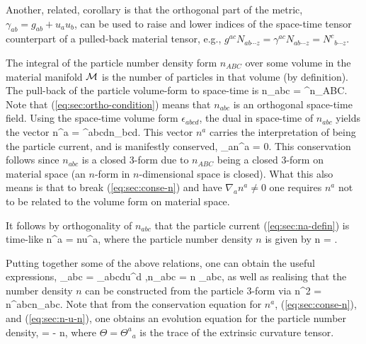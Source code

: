 Another, related, corollary is that the orthogonal part of the metric, $\gamma_{ab} = g_{ab} + u_au_b$, can be used to raise and lower indices of the space-time tensor counterpart of a pulled-back material tensor, e.g., $g^{ac}N_{ab\cdots z} = \gamma^{ac}N_{ab\cdots z} = {N^c}_{b\cdots z}$.

The integral of the particle number density form $n_{ABC}$ over some volume in the material manifold $\mathcal{M}$ is the number of particles in that volume (by definition). The pull-back of the particle volume-form to   space-time   is
\bea
n_{abc} = \psi^\star n_{ABC}.
\eea
Note that (\ref{eq:sec:ortho-condition}) means that $n_{abc}$ is an orthogonal space-time field.
Using   the space-time volume form $\epsilon_{abcd}$, the dual in space-time of $n_{abc}$ yields the vector
\bea
\label{eq:sec:na-defin}
n^a = \epsilon^{abcd}n_{bcd}.
\eea
This vector $n^a$ carries the interpretation of being the particle current, and is manifestly conserved,
\bea
\label{eq:sec:conse-n}
\nabla_an^a = 0.
\eea
This conservation follows since $n_{abc}$ is a closed 3-form due to $n_{ABC}$ being a closed 3-form on material space (an $n$-form in $n$-dimensional space is closed). What this also means is that to break (\ref{eq:sec:conse-n}) and have $\nabla_an^a\neq 0$ one requires $n^a$ not to be related to the volume form on material space.  

It follows by orthogonality of $n_{abc}$ that the particle current (\ref{eq:sec:na-defin}) is time-like
\bea
\label{eq:sec:n-u-n}
n^a = nu^a,
\eea
where the particle number density $n$ is given by
\bea
n = .
\eea

Putting together some of the above relations, one can obtain the useful expressions,
\bse
\bea
\label{eq:sec:n-u-n-1}
\epsilon_{abc} = \epsilon_{abcd}u^d ,\qquad n_{abc} = n \epsilon_{abc},
\eea
as well as realising that the number density $n$ can be constructed from the particle 3-form via
\bea
n^2 = n^{abc}n_{abc}.
\eea
\ese
Note that from the conservation equation for $n^a$, (\ref{eq:sec:conse-n}), and (\ref{eq:sec:n-u-n}), one obtains an evolution equation for the particle number density,
\bea
\label{ev_n}
 = - n\Theta,
\eea
where $\Theta = {\Theta^a}_a$ is the trace of the extrinsic curvature tensor.
 
